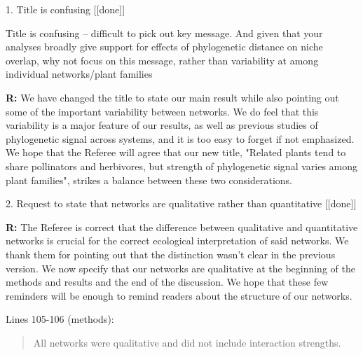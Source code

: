 \documentclass[12pt]{letter}
\newenvironment{refquote}{\bigskip \begin{it}}{\end{it}\smallskip}
\begin{document}
	1. Title is confusing [[done]]

		\begin{refquote}
			Title is confusing – difficult to pick out key message. And given that your analyses broadly give support for effects of phylogenetic distance on niche overlap, why not focus on this message, rather than variability at among individual networks/plant families
		\end{refquote}


		\textbf{R:} We have changed the title to state our main result while also pointing out some of the important variability between networks. We do feel that this variability is a major feature of our results, as well as previous studies of phylogenetic signal across systems, and it is too easy to forget if not emphasized. We hope that the Referee will agree that our new title, "Related plants tend to share pollinators and herbivores, but strength of phylogenetic signal varies among plant families", strikes a balance between these two considerations.




	2. Request to state that networks are qualitative rather than quantitative [[done]]

		\textbf{R:} The Referee is correct that the difference between qualitative and quantitative networks is crucial for the correct ecological interpretation of said networks. We thank them for pointing out that the distinction wasn't clear in the previous version. We now specify that our networks are qualitative at the beginning of the methods and results and the end of the discussion. We hope that these few reminders will be enough to remind readers about the structure of our networks.

		Lines 105-106 (methods):

		\begin{quotation}

			All networks were qualitative and did not include interaction strengths.

		\end{quotation}
\end{document}
